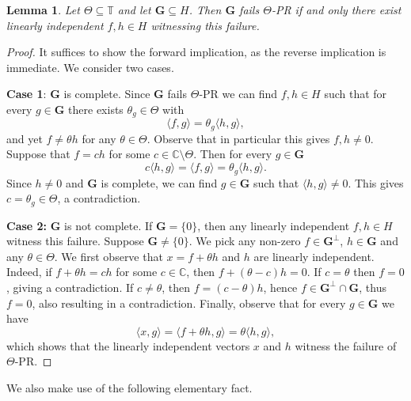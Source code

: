 \documentclass[reqno,a4paper,11pt]{amsart}
\numberwithin{equation}{section}
\newtheorem{lemma}[definition]{Lemma}
\def\T{{\mathbb T}}
\def\C{{\mathbb C}}
\newcommand\1{\mathds{1}}
\begin{document}
\begin{lemma}\label{lma:failure_witnessing}
    Let $\Theta\subseteq \T$ and let $\mathbf{G}
    \subseteq H$. Then $\mathbf{G}$ fails $\Theta$-PR if and only there exist linearly independent $f,h \in H$ witnessing this failure.
\end{lemma}
\begin{proof}
    It suffices to show the forward implication, as the reverse implication is immediate. We consider two cases.
    
    \textbf{Case 1}: $\mathbf{G}$ is complete. Since $\mathbf{G}$ fails $\Theta$-PR we can find $f,h\in H$ such that for every $g\in \mathbf{G}$ there exists $\theta_g\in \Theta$ with
    $$\langle f,g\rangle = \theta_g\langle h,g\rangle,$$
    and yet $f\neq \theta h$ for any $\theta \in \Theta$. Observe that in particular this gives $f,h\neq 0$. Suppose that $f=ch$ for some $c\in \C\setminus \Theta$. Then for every $g \in \mathbf{G}$ 
    $$c\langle h,g\rangle=\langle f,g\rangle = \theta_g\langle h,g\rangle.$$
    Since $h \neq 0$ and $\mathbf{G}$ is complete, we can find $g \in \mathbf{G}$ such that $\langle h,g\rangle\neq 0$. This gives $c=\theta_g \in \Theta$, a contradiction.

    \textbf{Case 2:} $\mathbf{G}$ is not complete. If $\mathbf{G}=\{0\}$, then any linearly independent $f,h\in H$ witness this failure. Suppose $\mathbf{G}\neq \{0\}$. We pick any non-zero $f\in \mathbf{G}^\perp$, $h\in \mathbf{G}$ and any $\theta \in \Theta$. We first observe that $x=f+\theta h$ and $h$ are linearly independent. Indeed, if $f+\theta h = ch$ for some $c\in \C$, then $f+(\theta -c)h=0$. If $c=\theta$ then $f=0$, giving a contradiction. If $c\neq \theta$, then $f = (c-\theta)h$, hence $f\in \mathbf{G}^\perp \cap \mathbf{G}$, thus $f=0$, also resulting in a contradiction. Finally, observe that for every $g\in \mathbf{G}$ we have
    $$\langle x,g \rangle = \langle f+\theta h,g\rangle = \theta \langle h,g\rangle,$$
    which shows that the linearly independent vectors $x$ and $h$ witness the failure of $\Theta$-PR.
\end{proof}

We also make use of the following elementary fact.
\end{document}

